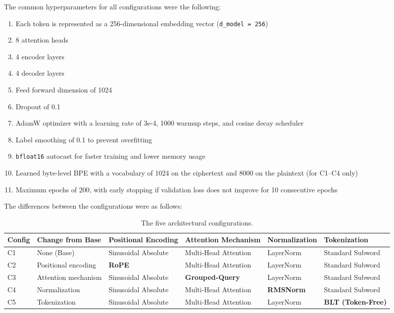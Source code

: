 \documentclass[12pt]{article}
\begin{document}
The common hyperparameters for all configurations were the following:

\begin{enumerate}\itemsep0pt
  \item Each token is represented as a 256-dimensional embedding vector
        (\texttt{d\_model = 256})
  \item 8 attention heads
  \item 4 encoder layers
  \item 4 decoder layers
  \item Feed forward dimension of 1024
  \item Dropout of 0.1
  \item AdamW optimizer with a learning rate of 3e-4, 1000 warmup steps, and
        cosine decay scheduler
  \item Label smoothing of 0.1 to prevent overfitting
  \item \texttt{bfloat16} autocast for faster training and lower memory usage
  \item Learned byte-level BPE with a vocabulary of 1024 on the ciphertext and
        8000 on the plaintext (for C1--C4 only)
  \item Maximum epochs of 200, with early stopping if validation loss does not
        improve for 10 consecutive epochs
\end{enumerate}

The differences between the configurations were as follows:

\begin{table}[!htb]
\centering
\small
\setlength{\tabcolsep}{4pt}
\begin{tabular}{@{}lR{2.2cm}R{2.2cm}R{2.3cm}R{2.4cm}R{2.4cm}@{}}
\toprule
Config & Change from Base & Positional Encoding & Attention Mechanism &
Normalization & Tokenization \\
\midrule
C1 & None (Base) & Sinusoidal Absolute & Multi-Head Attention & LayerNorm &
Standard Subword \\
C2 & Positional encoding & \textbf{RoPE} & Multi-Head Attention & LayerNorm &
Standard Subword \\
C3 & Attention mechanism & Sinusoidal Absolute & \textbf{Grouped-Query} &
LayerNorm & Standard Subword \\
C4 & Normalization & Sinusoidal Absolute & Multi-Head Attention &
\textbf{RMSNorm} & Standard Subword \\
C5 & Tokenization & Sinusoidal Absolute & Multi-Head Attention & LayerNorm &
\textbf{BLT (Token-Free)} \\
\bottomrule
\end{tabular}
\caption{The five architectural configurations.}
\end{table}
\end{document}
